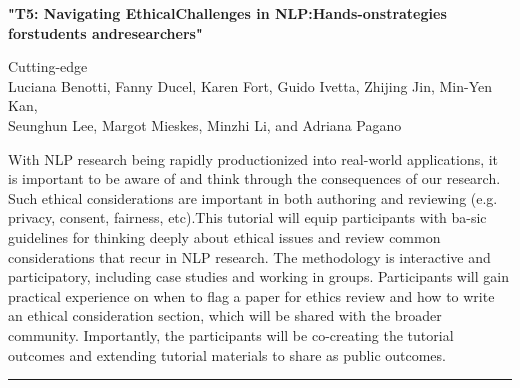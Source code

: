 \begin{center}
    \Large{\textbf{"T5: Navigating EthicalChallenges in NLP:Hands-onstrategies forstudents andresearchers"}\\}
    \par\bigskip
    \large{Cutting-edge}\\
    \large{Luciana Benotti, Fanny Ducel, Karen Fort, Guido Ivetta, Zhijing Jin, Min-Yen Kan, \\
Seunghun Lee, Margot Mieskes, Minzhi Li, and Adriana Pagano}\\
    \par\bigskip

\end{center}

With NLP research being rapidly productionized into real-world applications, it is important to be aware of and think through the consequences of our research. Such ethical considerations are important in both authoring and reviewing (e.g. privacy, consent, fairness, etc).This tutorial will equip participants with ba-sic guidelines for thinking deeply about ethical issues and review common considerations that recur in NLP research. The methodology is interactive and participatory, including case studies and working in groups. Participants will gain practical experience on when to flag a paper for ethics review and how to write an ethical consideration section, which will be shared with the broader community. Importantly, the participants will be co-creating the tutorial outcomes and extending tutorial materials to share as public outcomes.

\begin{center}
    \noindent\rule{200px}{1pt}
\end{center}
